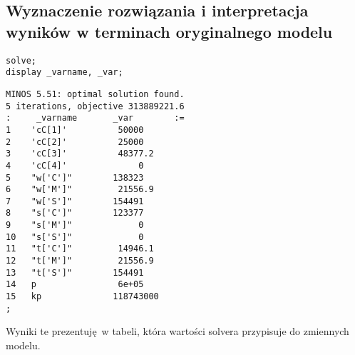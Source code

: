 \documentclass{article}
\begin{document}
\subsection{Wyznaczenie rozwiązania i interpretacja wyników w terminach oryginalnego modelu}

\lstset{language=BASH}
\begin{lstlisting}[caption={Komendy uruchamiające solver MINOS na stronie https://ampl.com/cgi-bin/ampl/amplcgi},label=DescriptiveLabel]
solve;
display _varname, _var;
\end{lstlisting}

\lstset{language=BASH}
\begin{lstlisting}[caption={Wynik solwera},label=DescriptiveLabel]
MINOS 5.51: optimal solution found.
5 iterations, objective 313889221.6
:     _varname       _var        :=
1    'cC[1]'          50000
2    'cC[2]'          25000
3    'cC[3]'          48377.2
4    'cC[4]'              0
5    "w['C']"        138323
6    "w['M']"         21556.9
7    "w['S']"        154491
8    "s['C']"        123377
9    "s['M']"             0
10   "s['S']"             0
11   "t['C']"         14946.1
12   "t['M']"         21556.9
13   "t['S']"        154491
14   p                6e+05
15   kp              118743000
;
\end{lstlisting}

Wyniki te prezentuję w tabeli, która wartości solvera przypisuje do zmiennych modelu.
\end{document}
